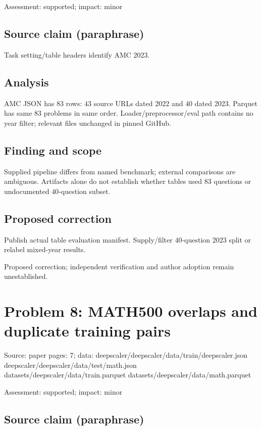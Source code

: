 \documentclass[11pt]{article}
\begin{document}
Assessment: supported; impact: minor

\subsection*{Source claim (paraphrase)}

Task setting/table headers identify AMC 2023.

\subsection*{Analysis}

AMC JSON has \(83\) rows: \(43\) source URLs dated \(2022\) and \(40\) dated 2023. Parquet has same \(83\) problems in same order. Loader/preprocessor/eval path contains no year filter; relevant files unchanged in pinned GitHub.

\subsection*{Finding and scope}

Supplied pipeline differs from named benchmark; external comparisons are ambiguous. Artifacts alone do not establish whether tables used \(83\) questions or undocumented \(40\)-question subset.

\subsection*{Proposed correction}

Publish actual table evaluation manifest. Supply/filter \(40\)-question \(2023\) split or relabel mixed-year results.

Proposed correction; independent verification and author adoption remain unestablished.

\section*{Problem 8: MATH500 overlaps and duplicate training pairs}

Source: paper pages: 7; data: deepscaler/deepscaler/data/train/deepscaler.json deepscaler/deepscaler/data/test/math.json datasets/deepscaler/data/train.parquet datasets/deepscaler/data/math.parquet

Assessment: supported; impact: minor

\subsection*{Source claim (paraphrase)}
\end{document}

